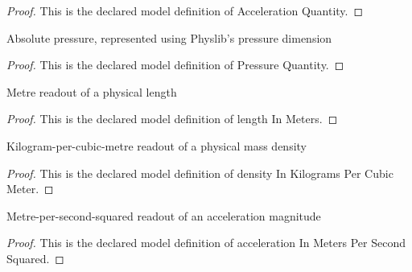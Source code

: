 \begin{proof}
  This is the declared model definition of Acceleration Quantity.
\end{proof}
\begin{definition}
  \label{def:physics:phyx-mini-0388:phyxminiproblems-problemphyxmini0388-pressurequantity}
  Absolute pressure, represented using Physlib's pressure dimension
\end{definition}
\begin{proof}
  This is the declared model definition of Pressure Quantity.
\end{proof}
\begin{definition}
  \label{def:physics:phyx-mini-0388:phyxminiproblems-problemphyxmini0388-lengthinmeters}
  Metre readout of a physical length
\end{definition}
\begin{proof}
  This is the declared model definition of length In Meters.
\end{proof}
\begin{definition}
  \label{def:physics:phyx-mini-0388:phyxminiproblems-problemphyxmini0388-densityinkilogramspercubicmeter}
  Kilogram-per-cubic-metre readout of a physical mass density
\end{definition}
\begin{proof}
  This is the declared model definition of density In Kilograms Per Cubic Meter.
\end{proof}
\begin{definition}
  \label{def:physics:phyx-mini-0388:phyxminiproblems-problemphyxmini0388-accelerationinmeterspersecondsquared}
  Metre-per-second-squared readout of an acceleration magnitude
\end{definition}
\begin{proof}
  This is the declared model definition of acceleration In Meters Per Second Squared.
\end{proof}
